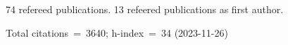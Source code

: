 74 refereed publications. 13 refeered publications as first author.

Total citations~=~3640; h-index~=~34 (2023-11-26)